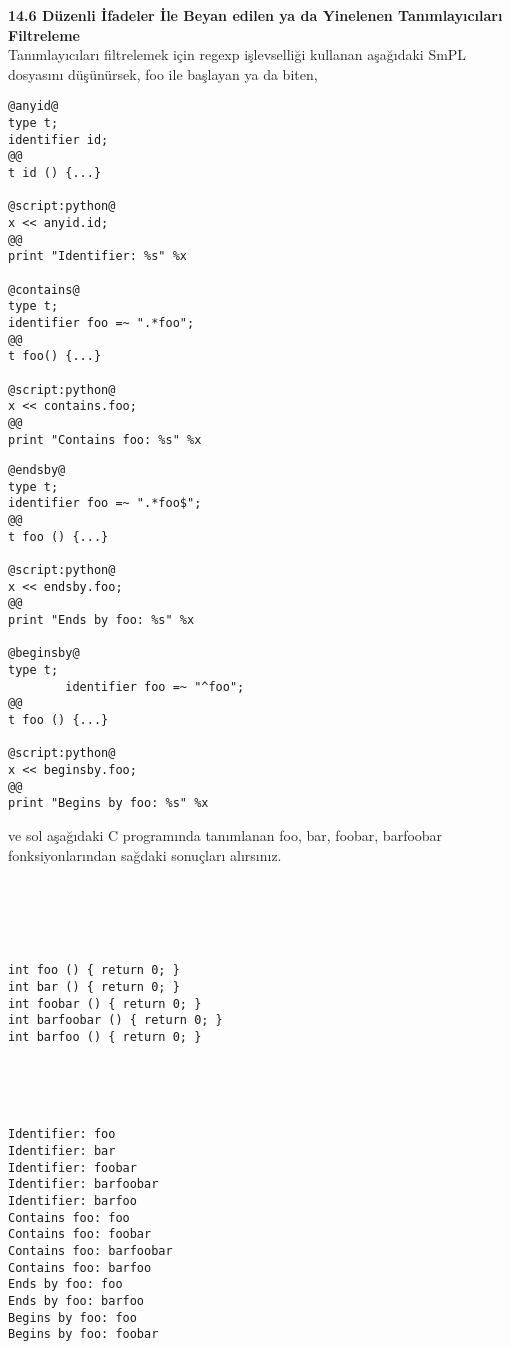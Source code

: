 \documentclass[22pt]{article}
\begin{document}
\textbf{14.6 Düzenli İfadeler İle Beyan edilen ya da Yinelenen Tanımlayıcıları Filtreleme}
\\
Tanımlayıcıları filtrelemek için regexp işlevselliği kullanan aşağıdaki SmPL dosyasını düşünürsek, foo ile başlayan ya da biten,
\\
\begin{multicols*}{2}
\begin{lstlisting}
@anyid@
type t;
identifier id;                          
@@                                      
t id () {...}                           

@script:python@                         
x << anyid.id;                          
@@                                      
print "Identifier: %s" %x               

@contains@                              
type t;                                 
identifier foo =~ ".*foo";              
@@                                      
t foo() {...}                           
 
@script:python@                         
x << contains.foo;                      
@@                                      
print "Contains foo: %s" %x
\end{lstlisting}
\columnbreak
\begin{lstlisting}
@endsby@
type t;
identifier foo =~ ".*foo$";
@@
t foo () {...}

@script:python@ 
x << endsby.foo;
@@
print "Ends by foo: %s" %x

@beginsby@
type t;
        identifier foo =~ "^foo"; 
@@
t foo () {...}

@script:python@
x << beginsby.foo;
@@
print "Begins by foo: %s" %x
\end{lstlisting}
\end{multicols*}
ve sol aşağıdaki C programında tanımlanan foo, bar, foobar, barfoobar fonksiyonlarından sağdaki sonuçları alırsınız.
\\
\begin{multicols*}{2}
\begin{lstlisting}
                                        


                                        
                                        
int foo () { return 0; }                
int bar () { return 0; }                
int foobar () { return 0; }             
int barfoobar () { return 0; }          
int barfoo () { return 0; }             
                                        
                                        
                                        
                                        
\end{lstlisting}
\columnbreak
\begin{lstlisting}
Identifier: foo
Identifier: bar
Identifier: foobar
Identifier: barfoobar
Identifier: barfoo
Contains foo: foo
Contains foo: foobar
Contains foo: barfoobar
Contains foo: barfoo
Ends by foo: foo
Ends by foo: barfoo
Begins by foo: foo
Begins by foo: foobar
\end{lstlisting}
\end{multicols*}
\end{document}
